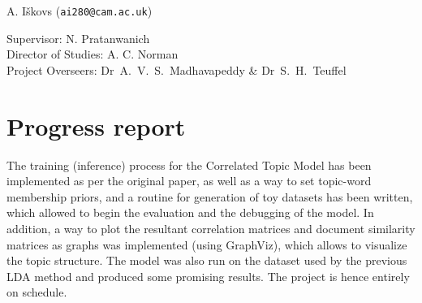 \documentclass[12pt,a4]{article}
\begin{document}
\begin{center}

A. I\v{s}kovs (\texttt{ai280@cam.ac.uk})

\vspace{0.3in}
\textbf{}
\vspace{0.4in}

Supervisor: N. Pratanwanich\\
Director of Studies: A. C. Norman\\
Project Overseers: Dr~A.~V.~S.~Madhavapeddy  \& Dr~S.~H.~Teuffel\\

\end{center}


\section*{Progress report}

The training (inference) process for the Correlated Topic Model has been implemented as per the original paper, as well as a way to set topic-word membership priors, and a routine for generation of toy datasets has been written, which allowed to begin the evaluation and the debugging of the model. In addition, a way to plot the resultant correlation matrices and document similarity matrices as graphs was implemented (using GraphViz), which allows to visualize the topic structure. The model was also run on the dataset used by the previous LDA method and produced some promising results. The project is hence entirely on schedule.
\end{document}
